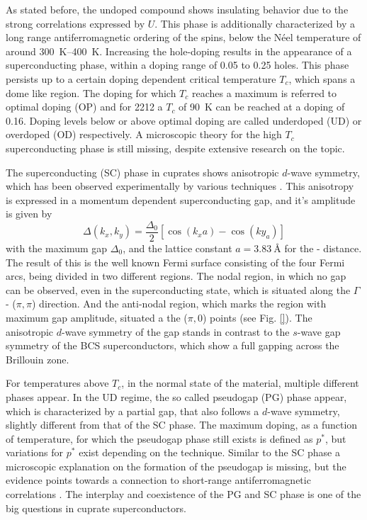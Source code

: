 As stated before, the undoped compound shows insulating behavior due to the strong correlations expressed by $U$.
This phase is additionally characterized by a long range antiferromagnetic ordering of the spins, below the Néel temperature of around \qtyrange{300}{400}{\kelvin}.
Increasing the hole-doping results in the appearance of a superconducting phase, within a doping range of 0.05 to 0.25 holes.
This phase persists up to a certain doping dependent critical temperature $T_c$, which spans a dome like region.
The doping for which $T_c$ reaches a maximum is referred to optimal doping (OP) and for 2212 a $T_c$ of \qty{90}{\kelvin} can be reached at a doping of 0.16.
Doping levels below or above optimal doping are called underdoped (UD) or overdoped (OD) respectively.
A microscopic theory for the high $T_c$ superconducting phase is still missing, despite extensive research on the topic.

The superconducting (SC) phase in cuprates shows anisotropic $d$-wave symmetry, which has been observed experimentally by various techniques \cite{}.
This anisotropy is expressed in a momentum dependent superconducting gap, and it's amplitude is given by
\begin{equation}
	\Delta(k_x,k_y) = \frac{\Delta_0}{2}\left[\cos(k_xa)-\cos(ky_a)\right]
\end{equation}
with the maximum gap $\Delta_0$, and the lattice constant $a=\qty{3.83}{\angstrom}$ for the - distance.
The result of this is the well known Fermi surface consisting of the four Fermi arcs, being divided in two different regions.
The nodal region, in which no gap can be observed, even in the superconducting state, which is situated along the $\Gamma$ - ($\pi, \pi$) direction.
And the anti-nodal region, which marks the region with maximum gap amplitude, situated a the ($\pi, 0$) points (see Fig. \ref{}).
The anisotropic $d$-wave symmetry of the gap stands in contrast to the $s$-wave gap symmetry of the BCS superconductors, which show a full gapping across the Brillouin zone.

For temperatures above $T_c$, in the normal state of the material, multiple different phases appear.
In the UD regime, the so called pseudogap (PG) phase appear, which is characterized by a partial gap, that also follows a $d$-wave symmetry, slightly different from that of the SC phase.
The maximum doping, as a function of temperature, for which the pseudogap phase still exists is defined as $p^*$, but variations for $p^*$ exist depending on the technique.
Similar to the SC phase a microscopic explanation on the formation of the pseudogap is missing, but the evidence points towards a connection to short-range antiferromagnetic correlations \cite{}.
The interplay and coexistence of the PG and SC phase is one of the big questions in cuprate superconductors.

